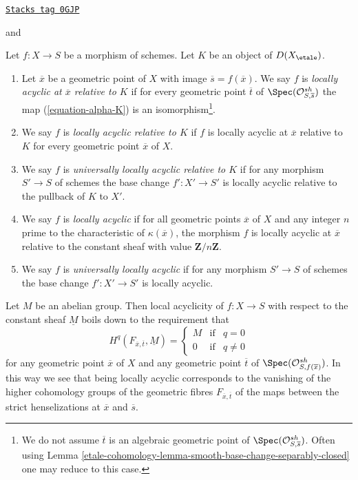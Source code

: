 \begin{definition}
\label{etale-cohomology-definition-locally-acyclic}
\href{https://stacks.math.columbia.edu/tag/0GJP}{\texttt{Stacks tag 0GJP}}

\begin{reference}
\cite[Definition 2.12, page 242]{SGA4.5} and
\cite[Definition (1.3), page 54]{SGA4.5}
\end{reference}
Let $f : X \to S$ be a morphism of schemes.
Let $K$ be an object of $D(X_\etale)$.
\begin{enumerate}
\item
Let $\overline{x}$ be a geometric point of $X$ with image
$\overline{s} = f(\overline{x})$.
We say $f$ is {\it locally acyclic at $\overline{x}$ relative to $K$}
if for every geometric point $\overline{t}$ of
$\Spec(\mathcal{O}^{sh}_{S, \overline{s}})$ the
map (\ref{equation-alpha-K}) is an isomorphism\footnote{We do not
assume $\overline{t}$ is an algebraic geometric point of
$\Spec(\mathcal{O}^{sh}_{S, \overline{s}})$. Often using
Lemma \ref{etale-cohomology-lemma-smooth-base-change-separably-closed}
one may reduce to this case.}.
\item We say $f$ is {\it locally acyclic relative to $K$}
if $f$ is locally acyclic at $\overline{x}$ relative to $K$
for every geometric point $\overline{x}$ of $X$.
\item We say $f$ is {\it universally locally acyclic relative to $K$}
if for any morphism $S' \to S$ of schemes the base change $f' : X' \to S'$
is locally acyclic relative to the pullback of $K$ to $X'$.
\item We say $f$ is {\it locally acyclic} if for all geometric
points $\overline{x}$ of $X$ and any integer $n$ prime to the characteristic
of $\kappa(\overline{x})$, the morphism $f$ is locally acyclic
at $\overline{x}$ relative to the constant sheaf with value
$\mathbf{Z}/n\mathbf{Z}$.
\item We say $f$ is {\it universally locally acyclic} if
for any morphism $S' \to S$ of schemes the base change $f' : X' \to S'$
is locally acyclic.
\end{enumerate}
\end{definition}

Let $M$ be an abelian group. Then local acyclicity of $f : X \to S$
with respect to the constant sheaf $\underline{M}$ boils down
to the requirement that
$$
H^q(F_{\overline{x}, \overline{t}}, \underline{M}) =
\left\{
\begin{matrix}
M & \text{if} & q = 0 \\
0 & \text{if} & q \not = 0
\end{matrix}
\right.
$$
for any geometric point $\overline{x}$ of $X$ and any geometric
point $\overline{t}$ of $\Spec(\mathcal{O}^{sh}_{S, f(\overline{x})})$.
In this way we see that being locally acyclic corresponds to the
vanishing of the higher cohomology groups of the geometric fibres
$F_{\overline{x}, \overline{t}}$ of the maps between the
strict henselizations at $\overline{x}$ and $\overline{s}$.

